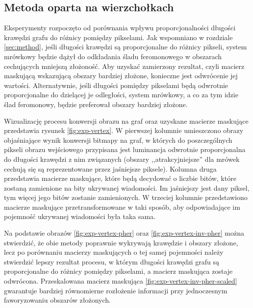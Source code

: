 {{        %
        \subsection{Metoda oparta na wierzchołkach}
        {
            Eksperymenty rozpoczęto od porównania wpływu proporcjonalności długości krawędzi grafu do różnicy pomiędzy
            pikselami. Jak wspomniano w rozdziale \ref{sec:method}, jeśli długości krawędzi są proporcjonalne do różnicy
            pikseli, system mrówkowy będzie dążył do odkładania śladu feromonowego w obszarach cechujących mniejszą
            złożoność. Aby uzyskać zamierzony rezultat, czyli macierz maskującą wskazującą obszary bardziej złożone,
            konieczne jest odwrócenie jej wartości. Alternatywnie, jeśli długości pomiędzy pikselami będą odwrotnie
            proporcjonalne do dzielącej je odległości, system mrówkowy, a co za tym idzie ślad feromonowy, będzie
            preferował obszary bardziej złożone.

            Wizualizację procesu konwersji obrazu na graf oraz uzyskane macierze maskujące przedstawia rysunek
            \ref{fig:exp-vertex}. W pierwszej kolumnie umieszczono obrazy objaśniające wynik konwersji bitmapy na graf,
            w których do poszczególnych pikseli obrazu wejściowego przypisana jest luminancja odwrotnie proporcjonalna
            do długości krawędzi z nim związanych (obszary ,,atrakcyjniejsze'' dla mrówek cechują się są reprezentowane
            przez jaśniejsze piksele). Kolumna druga przedstawia macierze maskujące, które będą decydować o liczbie
            bitów, które zostaną zamienione na bity ukrywanej wiadomości. Im jaśniejszy jest dany piksel, tym więcej
            jego bitów zostanie zamienionych. W trzeciej kolumnie przedstawiono macierze maskujące przetransformowane w
            taki sposób, aby odpowiadające im pojemność ukrywanej wiadomości była taka sama.

            Na podstawie obrazów \ref{fig:exp-vertex-pher} oraz \ref{fig:exp-vertex-inv-pher} można stwierdzić, że obie
            metody poprawnie wykrywają krawędzie i obszary złożone, lecz po porównaniu macierzy maskujących o tej samej
            pojemności należy stwierdzić lepszy rezultat procesu, w którym długości krawędzi grafu są proporcjonalne do
            różnicy pomiędzy pikselami, a macierz maskująca zostaje odwrócona. Przeskalowana macierz maskująca
            \ref{fig:exp-vertex-inv-pher-scaled} gwarantuje bardziej równomierne rozłożenie informacji przy jednoczesnym
            faworyzowaniu obszarów złożonych.

}}}

